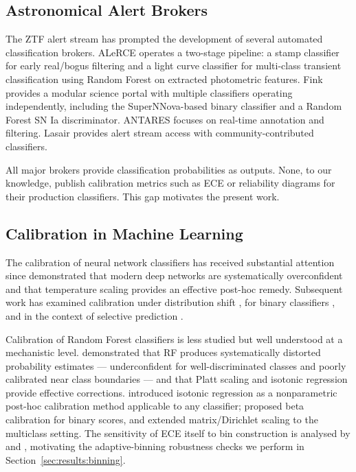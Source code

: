 \subsection{Astronomical Alert Brokers}
\label{sec:related:brokers}

The ZTF alert stream has prompted the development of several
automated classification brokers. ALeRCE \citep{Forster2021}
operates a two-stage pipeline: a stamp classifier for early
real/bogus filtering and a light curve classifier
\citep{Sanchez-Saez2021, Pavez-Herrera2025} for multi-class
transient classification using Random Forest on extracted
photometric features. Fink \citep{Moller2021} provides a modular 
science portal with multiple classifiers operating 
independently, including the SuperNNova-based binary 
classifier \citep{Moller2019} and a Random Forest 
SN Ia discriminator. ANTARES \citep{Narayan2018} focuses 
on real-time annotation and filtering. Lasair 
\citep{Smith2019} provides alert stream access with 
community-contributed classifiers.

All major brokers provide classification probabilities 
as outputs. None, to our knowledge, publish calibration 
metrics such as ECE or reliability diagrams for their 
production classifiers. This gap motivates the present work.

\subsection{Calibration in Machine Learning}
\label{sec:related:calibration}

The calibration of neural network classifiers has received 
substantial attention since \citet{Guo2017} demonstrated 
that modern deep networks are systematically overconfident 
and that temperature scaling provides an effective post-hoc 
remedy. Subsequent work has examined calibration under 
distribution shift \citep{Ovadia2019}, for binary 
classifiers \citep{Kull2017}, and in the context of 
selective prediction \citep{Geifman2017}.

Calibration of Random Forest classifiers is less studied
but well understood at a mechanistic level.
\citet{Niculescu-Mizil2005} demonstrated that RF produces
systematically distorted probability estimates —
underconfident for well-discriminated classes and poorly
calibrated near class boundaries — and that Platt scaling
\citep{Platt1999} and isotonic regression provide effective
corrections. \citet{Zadrozny2002} introduced isotonic
regression as a nonparametric post-hoc calibration method
applicable to any classifier; \citet{Kull2017} proposed beta
calibration for binary scores, and \citet{Kull2019} extended
matrix/Dirichlet scaling to the multiclass setting. The
sensitivity of ECE itself to bin construction is analysed by
\citet{Nixon2019} and \citet{Roelofs2022}, motivating the
adaptive-binning robustness checks we perform in
Section~\ref{sec:results:binning}.

